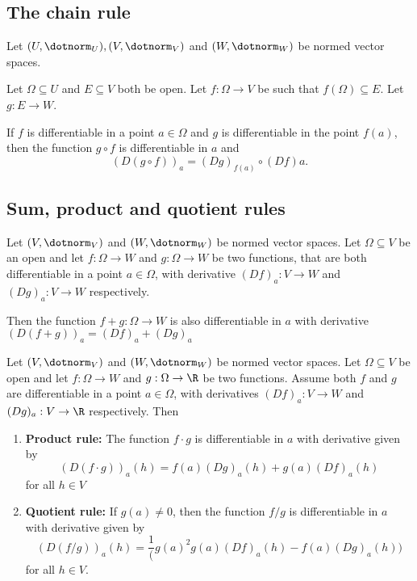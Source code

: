 \subsection{The chain rule}

\begin{theorem}
    Let $(U,\dotnorm_U), (V, \dotnorm_V)$ and $(W, \dotnorm_W)$ be normed vector spaces.

    Let $\Omega \subseteq U$ and $E \subseteq V$ both be open. Let $f:\Omega \to V$ be such that
    $f(\Omega) \subseteq E$. Let $g: E \to W$.

    If $f$ is differentiable in a point $a \in \Omega$ and $g$ is differentiable in the point $f(a)$,
    then the function $g \circ f$ is differentiable in $a$ and
    $$(D(g \circ f))_a = (Dg)_{f(a)} \circ (Df)a.$$
\end{theorem}

\subsection{Sum, product and quotient rules}
\begin{theorem}
    Let $(V,\dotnorm_V)$ and $(W,\dotnorm_W)$ be normed vector spaces. Let $\Omega \subseteq V$ be an open
    and let $f: \Omega \to W$ and $g: \Omega \to W$ be two functions, that are both differentiable in a
    point $a \in \Omega$, with derivative $(Df)_a:V \to W$ and $(Dg)_a:V \to W$ respectively.

    Then the function $f+g: \Omega \to W$ is also differentiable in $a$ with derivative
    $(D(f+g))_a = (Df)_a + (Dg)_a$
\end{theorem}

\begin{theorem}
    Let $(V,\dotnorm_V)$ and $(W,\dotnorm_W)$ be normed vector spaces. Let $\Omega \subseteq V$ be open
    and let $f:\Omega \to W$ and $g:\Omega \to \R$ be two functions. Assume both $f$ and $g$ are 
    differentiable in a point $a \in \Omega$, with derivatives $(Df)_a:V \to W$ and $(Dg)_a:V \to \R$
    respectively. Then
    \begin{enumerate}
        \item \textbf{Product rule:} The function $f \cdot g$ is differentiable in $a$ with derivative given by
            $$(D(f \cdot g))_a(h) = f(a)(Dg)_a(h) + g(a)(Df)_a(h)$$
            for all $h \in V$
        \item \textbf{Quotient rule:} If $g(a) \ne 0$, then the function $f/g$ is differentiable in $a$ with
            derivative given by
            $$(D(f/g))_a(h) = \frac{1}({g(a)^2}g(a)(Df)_a(h) - f(a)(Dg)_a(h))$$
            for all $h \in V$.
    \end{enumerate}
\end{theorem}

